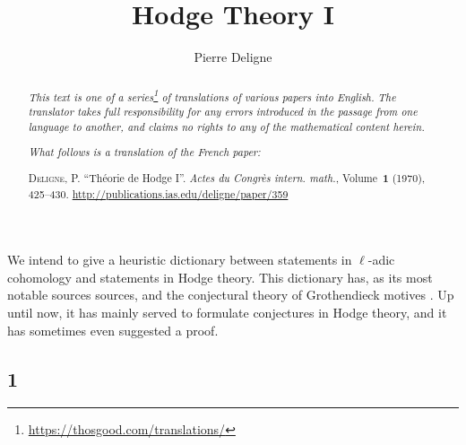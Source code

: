 \documentclass{article}
\title{Hodge Theory I}
\author{Pierre Deligne}
\date{}
\theoremstyle{plain}
\theoremstyle{definition}
\newcommand{\oldpage}[1]{\marginpar{\footnotesize$\Big\vert$ \textit{p.~#1}}}
\begin{document}
\maketitle
\thispagestyle{fancy}

\renewcommand{\abstractname}{Translator's note.}

\begin{abstract}
  \renewcommand*{\thefootnote}{\fnsymbol{footnote}}
  \emph{This text is one of a series\footnote{\url{https://thosgood.com/translations/}} of translations of various papers into English.}
  \emph{The translator takes full responsibility for any errors introduced in the passage from one language to another, and claims no rights to any of the mathematical content herein.}
  
  \emph{What follows is a translation of the French paper:}

  \medskip\noindent
  \textsc{Deligne, P.}
  ``Th\'{e}orie de Hodge I''.
  \emph{Actes du Congr\`{e}s intern. math.}, Volume~\textbf{1} (1970), 425--430.
  \url{http://publications.ias.edu/deligne/paper/359}
\end{abstract}

\setcounter{footnote}{0}

\bigskip



\oldpage{425}
We intend to give a heuristic dictionary between statements in $\ell$-adic cohomology and statements in Hodge theory.
This dictionary has, as its most notable sources sources, \cite{3} and the conjectural theory of Grothendieck motives \cite{2}.
Up until now, it has mainly served to formulate conjectures in Hodge theory, and it has sometimes even suggested a proof.


\subsection*{1}
\end{document}
